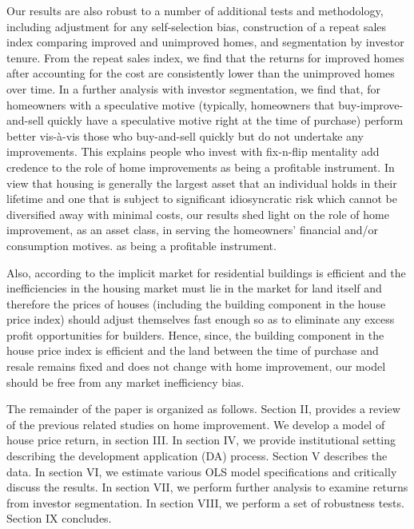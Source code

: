 \documentclass[AEJ,reqno, draftmode]{AEA} %
\begin{document}
Our results are also robust to a number of additional tests and methodology, including adjustment for any self-selection bias, construction of a repeat sales index comparing improved and unimproved homes, and segmentation by investor tenure. From the repeat sales index, we find that the returns for improved homes after accounting for the cost are consistently lower than the unimproved homes over time. In a further analysis with investor segmentation, we find that, for homeowners with a speculative motive (typically, homeowners that buy-improve-and-sell quickly have a speculative motive right at the time of purchase) perform better vis-à-vis those who buy-and-sell quickly but do not undertake any improvements. This explains people who invest with fix-n-flip mentality add credence to the role of home improvements as being a profitable instrument. In view that housing is generally the largest asset that an individual holds in their lifetime and one that is subject to significant idiosyncratic risk which cannot be diversified away with minimal costs, our results shed light on the role of home improvement, as an asset class, in serving the homeowners' financial and/or consumption motives. as being a profitable instrument. 

Also, according to \citet{rosenthal1999residential} the implicit market for residential buildings is efficient and the inefficiencies in the housing market must lie in the market for land itself and therefore the prices of houses (including the building component in the house price index) should adjust themselves fast enough so as to eliminate any excess profit opportunities for builders. Hence, since, the building component in the house price index is efficient and the land between the time of purchase and resale remains fixed and does not change with home improvement, our model should be free from any market inefficiency bias.

The remainder of the paper is organized as follows. Section II, provides a review of the previous related studies on home improvement. We develop a model of house price return, in section III. In section IV, we provide institutional setting describing the development application (DA) process. Section V describes the data. In section VI, we estimate various OLS model specifications and critically discuss the results. In section VII, we perform further analysis to examine returns from investor segmentation. In section VIII, we perform a set of robustness tests. Section IX concludes.


\clearpage
\end{document}

